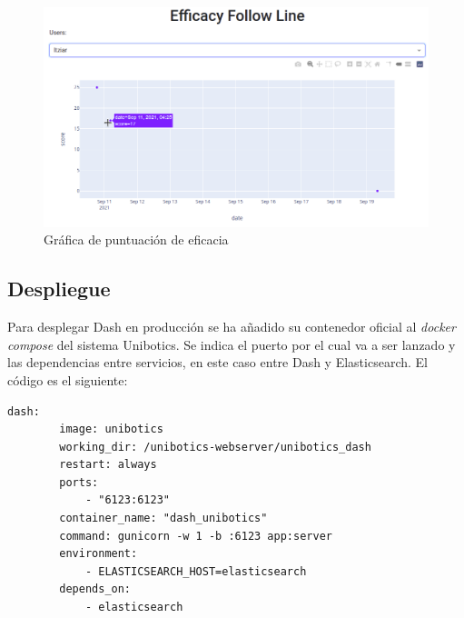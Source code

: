 \begin{figure}[H]
    \centering
    \includegraphics[width=17cm, keepaspectratio]{img/score_efficacy.png}
    \caption{Gráfica de puntuación de eficacia}
    \label{fig:score_efficacy}
\end{figure}
\subsection{Despliegue}
Para desplegar Dash en producción se ha añadido su contenedor oficial al \textit{docker compose} del sistema Unibotics. Se indica el puerto por el cual va a ser lanzado y las dependencias entre servicios, en este caso entre Dash y Elasticsearch. El código es el siguiente:\\


\begin{lstlisting}
dash:
        image: unibotics
        working_dir: /unibotics-webserver/unibotics_dash
        restart: always
        ports:
            - "6123:6123"
        container_name: "dash_unibotics"
        command: gunicorn -w 1 -b :6123 app:server
        environment:
            - ELASTICSEARCH_HOST=elasticsearch
        depends_on:
            - elasticsearch
\end{lstlisting} 
